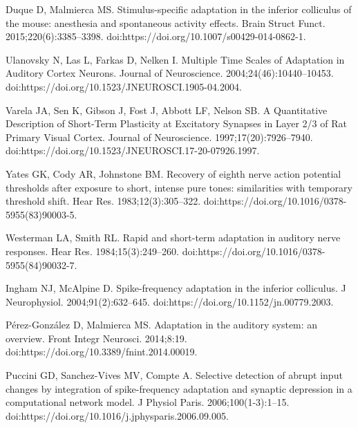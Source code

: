 \documentclass[10pt,letterpaper]{article}
\begin{document}
\begin{thebibliography}{100}
  Duque D, Malmierca MS.
  \newblock Stimulus-specific adaptation in the inferior colliculus of the mouse:
    anesthesia and spontaneous activity effects.
  \newblock Brain Struct Funct. 2015;220(6):3385--3398.
  \newblock doi:{https://doi.org/10.1007/s00429-014-0862-1}.
  
  Ulanovsky N, Las L, Farkas D, Nelken I.
  \newblock Multiple {Time} {Scales} of {Adaptation} in {Auditory} {Cortex}
    {Neurons}.
  \newblock Journal of Neuroscience. 2004;24(46):10440--10453.
  \newblock doi:{https://doi.org/10.1523/JNEUROSCI.1905-04.2004}.
  
  Varela JA, Sen K, Gibson J, Fost J, Abbott LF, Nelson SB.
  \newblock A {Quantitative} {Description} of {Short}-{Term} {Plasticity} at
    {Excitatory} {Synapses} in {Layer} 2/3 of {Rat} {Primary} {Visual} {Cortex}.
  \newblock Journal of Neuroscience. 1997;17(20):7926--7940.
  \newblock doi:{https://doi.org/10.1523/JNEUROSCI.17-20-07926.1997}.
  
  Yates GK, Cody AR, Johnstone BM.
  \newblock Recovery of eighth nerve action potential thresholds after exposure
    to short, intense pure tones: similarities with temporary threshold shift.
  \newblock Hear Res. 1983;12(3):305--322.
  \newblock doi:{https://doi.org/10.1016/0378-5955(83)90003-5}.
  
  Westerman LA, Smith RL.
  \newblock Rapid and short-term adaptation in auditory nerve responses.
  \newblock Hear Res. 1984;15(3):249--260.
  \newblock doi:{https://doi.org/10.1016/0378-5955(84)90032-7}.
  
  Ingham NJ, McAlpine D.
  \newblock Spike-frequency adaptation in the inferior colliculus.
  \newblock J Neurophysiol. 2004;91(2):632--645.
  \newblock doi:{https://doi.org/10.1152/jn.00779.2003}.
  
  P{\'e}rez-Gonz{\'a}lez D, Malmierca MS.
  \newblock Adaptation in the auditory system: an overview.
  \newblock Front Integr Neurosci. 2014;8:19.
  \newblock doi:{https://doi.org/10.3389/fnint.2014.00019}.
  
  Puccini GD, Sanchez-Vives MV, Compte A.
  \newblock Selective detection of abrupt input changes by integration of
    spike-frequency adaptation and synaptic depression in a computational network
    model.
  \newblock J Physiol Paris. 2006;100(1-3):1--15.
  \newblock doi:{https://doi.org/10.1016/j.jphysparis.2006.09.005}.
  

\end{thebibliography}
\end{document}
